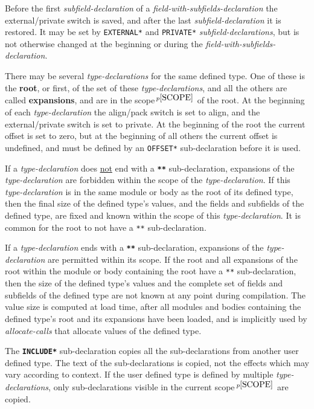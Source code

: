 \documentclass[12pt]{article}
\newcommand{\key}[1]{{\rm \bfseries #1}}
\newcommand{\ttkey}[1]{{\tt \bfseries #1}}
\newcommand{\skey}[2]{{\rm \bfseries #1#2}}
\newcommand{\pagnote}[1]{$\,^{p\pageref{#1}}$}
\begin{document}
Before the first {\em subfield-declaration} of a
{\em field-with-subfields-declaration} the external/private switch is
saved, and after the last {\em subfield-declaration} it is restored.
It may be set by {\tt *EXTERNAL*} and {\tt *PRIVATE*}
{\em subfield-declarations}, but is not otherwise changed at the
beginning or during the {\em field-with-subfields-declaration}.

There may be several {\em type-declarations}
for the same defined type.
One of these is the \key{root},
or first, of the set of these
{\em type-declarations}, and all the others are called
\skey{expansion}s, and are in the scope\pagnote{SCOPE} of the root.
At the beginning of each {\em type-declaration}
the align/pack switch is set to align, and the external/private
switch is set to private.  At the beginning of the root the
current offset is set to zero, but at the beginning of all others
the current offset is undefined, and must be defined
by an {\tt *OFFSET*} sub-declaration before it is used.

If a {\em type-declaration} does \underline{not} end with a \ttkey{***}
sub-declaration, expansions of the {\em type-declaration} are forbidden
within the scope of the {\em type-declaration}.  If this {\em type-declaration}
is in the same module or body as the root of its defined type,
then the final size of the defined type's values, and the
fields and subfields of the defined type, are fixed
and known within the scope of this {\em type-declaration}.
It is common for the root to not have a {\tt ***} sub-declaration.

If a {\em type-declaration} ends with a \ttkey{***}
sub-declaration, expansions of the {\em type-declaration} are permitted
within its scope.  If the root and all expansions of the root
within the module or body containing the root
have a {\tt ***}
sub-declaration, then the size of the defined type's values
and the complete set of fields and subfields
of the defined type are not known at any point during compilation.
The value size is computed at load time, after all modules and bodies
containing the defined type's root and its expansions have been loaded,
and is implicitly used by {\em allocate-calls}
that allocate values of the defined type.

The \ttkey{*INCLUDE*} sub-declaration copies all the sub-declarations
from another user defined type.
The text of the sub-declarations is copied, not the effects which may
vary according to context.
If the user defined type is
defined by multiple {\em type-declarations}, only sub-declarations
visible in the current scope\pagnote{SCOPE} are copied.
\end{document}
